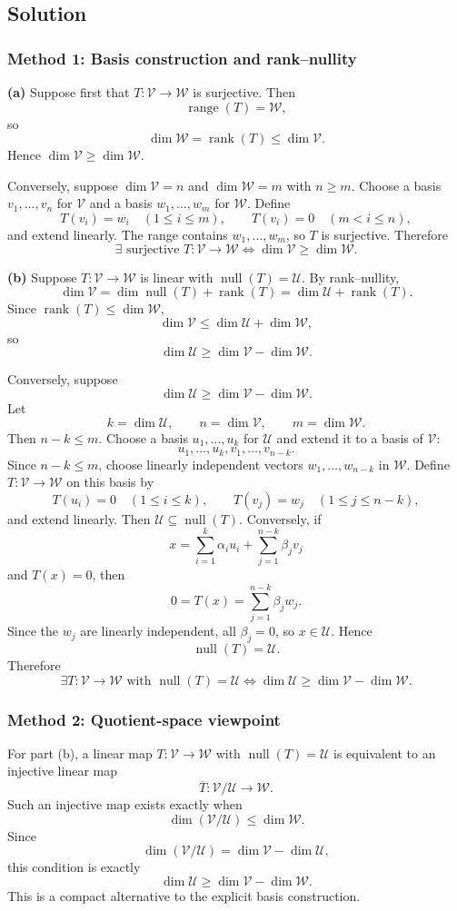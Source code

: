 \documentclass[12pt]{article}
\newcommand{\V}{\mathcal{V}}
\newcommand{\W}{\mathcal{W}}
\newcommand{\U}{\mathcal{U}}
\newcommand{\Null}{\operatorname{null}}
\newcommand{\Range}{\operatorname{range}}
\newcommand{\rank}{\operatorname{rank}}
\begin{document}
\subsection{Solution}

\subsubsection{Method 1: Basis construction and rank--nullity}
\textbf{(a)} Suppose first that $T:\V\to\W$ is surjective. Then
\[
\Range(T)=\W,
\]
so
\[
\dim\W=\rank(T)\le\dim\V.
\]
Hence $\dim\V\ge\dim\W$.

Conversely, suppose $\dim\V=n$ and $\dim\W=m$ with $n\ge m$. Choose a basis $v_1,\ldots,v_n$ for $\V$ and a basis $w_1,\ldots,w_m$ for $\W$. Define
\[
T(v_i)=w_i\quad(1\le i\le m),
\qquad
T(v_i)=0\quad(m<i\le n),
\]
and extend linearly. The range contains $w_1,\ldots,w_m$, so $T$ is surjective. Therefore
\[
\boxed{\exists\text{ surjective }T:\V\to\W\iff \dim\V\ge\dim\W.}
\]

\textbf{(b)} Suppose $T:\V\to\W$ is linear with $\Null(T)=\U$. By rank--nullity,
\[
\dim\V=\dim\Null(T)+\rank(T)=\dim\U+
\rank(T).
\]
Since $\rank(T)\le\dim\W$,
\[
\dim\V\le\dim\U+
\dim\W,
\]
so
\[
\dim\U\ge\dim\V-\dim\W.
\]

Conversely, suppose
\[
\dim\U\ge\dim\V-\dim\W.
\]
Let
\[
k=\dim\U,
\qquad
n=\dim\V,
\qquad
m=\dim\W.
\]
Then $n-k\le m$. Choose a basis $u_1,
\ldots,u_k$ for $\U$ and extend it to a basis of $\V$:
\[
u_1,\ldots,u_k,v_1,\ldots,v_{n-k}.
\]
Since $n-k\le m$, choose linearly independent vectors $w_1,
\ldots,w_{n-k}$ in $\W$. Define $T:\V\to\W$ on this basis by
\[
T(u_i)=0\quad(1\le i\le k),
\qquad
T(v_j)=w_j\quad(1\le j\le n-k),
\]
and extend linearly. Then $\U\subseteq\Null(T)$. Conversely, if
\[
x=\sum_{i=1}^k\alpha_i u_i+
\sum_{j=1}^{n-k}\beta_jv_j
\]
and $T(x)=0$, then
\[
0=T(x)=\sum_{j=1}^{n-k}\beta_jw_j.
\]
Since the $w_j$ are linearly independent, all $\beta_j=0$, so $x\in\U$. Hence
\[
\Null(T)=\U.
\]
Therefore
\[
\boxed{\exists T:\V\to\W\text{ with }\Null(T)=\U
\iff
\dim\U\ge\dim\V-\dim\W.}
\]

\subsubsection{Method 2: Quotient-space viewpoint}
For part (b), a linear map $T:\V\to\W$ with $\Null(T)=\U$ is equivalent to an injective linear map
\[
\overline T:\V/\U\to\W.
\]
Such an injective map exists exactly when
\[
\dim(\V/\U)\le\dim\W.
\]
Since
\[
\dim(\V/\U)=\dim\V-\dim\U,
\]
this condition is exactly
\[
\dim\U\ge\dim\V-\dim\W.
\]
This is a compact alternative to the explicit basis construction.
\end{document}
